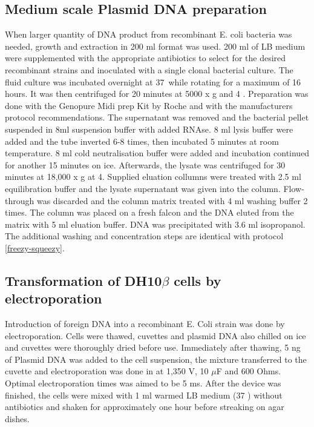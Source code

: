 \subsection{Medium scale Plasmid DNA preparation}

When larger quantity of DNA product from recombinant E. coli bacteria was needed, growth and extraction in 200 ml format was used. 200 ml of LB medium were supplemented with the appropriate antibiotics to select for the desired recombinant strains and inoculated with a single clonal bacterial culture. The fluid culture was incubated overnight at 37\C\ while rotating for a maximum of 16 hours. It was then centrifuged for 20 minutes at 5000 x g and 4 \C. Preparation was done with the Genopure Midi prep Kit by Roche and with the manufacturers protocol recommendations. The supernatant was removed and the bacterial pellet suspended in 8ml suspension buffer with added RNAse. 8 ml lysis buffer were added and the tube inverted 6-8 times, then incubated 5 minutes at room temperature. 8 ml cold neutralisation buffer were added and incubation continued for another 15 minutes on ice. Afterwards, the lysate was centrifuged for 30 minutes at 18,000 x g at 4\C. Supplied eluation collumns were treated with 2.5 ml equilibration buffer and the lysate supernatant was given into the column. Flow-through was discarded and the column matrix treated with 4 ml washing buffer 2 times. The column was placed on a fresh falcon and the DNA eluted from the matrix with 5 ml eluation buffer. DNA was precipitated with 3.6 ml isopropanol. The additional washing and concentration steps are identical with protocol \ref{freezy-squeezy}.

\subsection{Transformation of DH10\(\beta\) cells by electroporation}

Introduction of foreign DNA into a recombinant E. Coli strain was done by electroporation. Cells were thawed, cuvettes and plasmid DNA also chilled on ice and cuvettes were thoroughly dried before use. Immediately after thawing, 5 ng of Plasmid DNA was added to the cell suspension, the mixture transferred to the cuvette and electroporation was done in  at 1,350 V, 10 \(\mu\)F and 600 Ohms. Optimal electroporation times was aimed to be 5 ms. After the device was finished, the cells were mixed with 1 ml warmed LB medium (37 \C) without antibiotics and shaken for approximately one hour before streaking on agar dishes.

